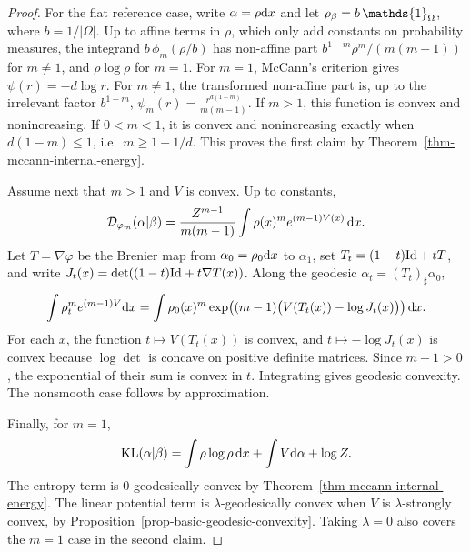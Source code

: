 \begin{proof}
	For the flat reference case, write \(\alpha=\rho\mathrm{d} x\) and let \(\density{\beta}=b\,\mathds{1}_\Omega\), where $b=1/|\Omega|$. Up to affine terms in \(\rho\), which only add constants on probability measures, the integrand \(b\,\phi_m(\rho/b)\) has non-affine part \(b^{1-m}\rho^m/(m(m-1))\) for \(m\neq1\), and \(\rho\log\rho\) for \(m=1\). For \(m=1\), McCann's criterion gives \(\psi(r)=-d\log r\). For \(m\neq1\), the transformed non-affine part is, up to the irrelevant factor \(b^{1-m}\),
	\(\psi_m(r)=\frac{r^{d(1-m)}}{m(m-1)}\).
	If \(m>1\), this function is convex and nonincreasing. If \(0<m<1\), it is convex and nonincreasing exactly when \(d(1-m)\leq1\), i.e.\ \(m\geq1-1/d\). This proves the first claim by Theorem~\ref{thm-mccann-internal-energy}.

	Assume next that \(m>1\) and \(V\) is convex. Up to constants,
	\[
		\mathcal{D}_{\varphi_m}(\alpha|\beta)
		=
		\frac{Z^{m-1}}{m(m-1)}
		\int \rho(x)^m e^{(m-1)V(x)}\,\mathrm{d} x.
	\]
	Let \(T=\nabla\varphi\) be the Brenier map from \(\alpha_0=\rho_0\mathrm{d} x\) to \(\alpha_1\), set \(T_t=(1-t)\mathrm{Id}+tT\), and write
	\(J_t(x)=\det((1-t)\mathrm{Id}+t\nabla T(x))\). Along the geodesic \(\alpha_t=(T_t)_\sharp\alpha_0\),
	\[
		\int \rho_t^m e^{(m-1)V}\mathrm{d} x
		=
		\int \rho_0(x)^m
		\exp\!\left((m-1)\big(V(T_t(x))-\log J_t(x)\big)\right)\mathrm{d} x.
	\]
	For each \(x\), the function \(t\mapsto V(T_t(x))\) is convex, and \(t\mapsto-\log J_t(x)\) is convex because \(\log\det\) is concave on positive definite matrices. Since \(m-1>0\), the exponential of their sum is convex in \(t\). Integrating gives geodesic convexity. The nonsmooth case follows by approximation.

	Finally, for \(m=1\),
	\[
		\operatorname{KL}(\alpha|\beta)
		=
		\int \rho\log\rho\,\mathrm{d} x+\int V\mathrm{d}\alpha+\log Z.
	\]
	The entropy term is \(0\)-geodesically convex by Theorem~\ref{thm-mccann-internal-energy}. The linear potential term is \(\lambda\)-geodesically convex when \(V\) is \(\lambda\)-strongly convex, by Proposition~\ref{prop-basic-geodesic-convexity}. Taking \(\lambda=0\) also covers the \(m=1\) case in the second claim.
\end{proof}
